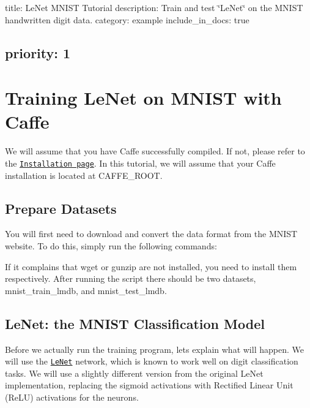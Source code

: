 

 title\+: Le\+Net M\+N\+I\+ST Tutorial description\+: Train and test \char`\"{}\+Le\+Net\char`\"{} on the M\+N\+I\+ST handwritten digit data. category\+: example include\+\_\+in\+\_\+docs\+: true \subsection*{priority\+: 1 }

\section*{Training Le\+Net on M\+N\+I\+ST with Caffe}

We will assume that you have Caffe successfully compiled. If not, please refer to the \href{/installation.html}{\tt Installation page}. In this tutorial, we will assume that your Caffe installation is located at {\ttfamily C\+A\+F\+F\+E\+\_\+\+R\+O\+OT}.

\subsection*{Prepare Datasets}

You will first need to download and convert the data format from the M\+N\+I\+ST website. To do this, simply run the following commands\+: 


If it complains that {\ttfamily wget} or {\ttfamily gunzip} are not installed, you need to install them respectively. After running the script there should be two datasets, {\ttfamily mnist\+\_\+train\+\_\+lmdb}, and {\ttfamily mnist\+\_\+test\+\_\+lmdb}.

\subsection*{Le\+Net\+: the M\+N\+I\+ST Classification Model}

Before we actually run the training program, let\textquotesingle{}s explain what will happen. We will use the \href{http://yann.lecun.com/exdb/publis/pdf/lecun-01a.pdf}{\tt Le\+Net} network, which is known to work well on digit classification tasks. We will use a slightly different version from the original Le\+Net implementation, replacing the sigmoid activations with Rectified Linear Unit (Re\+LU) activations for the neurons.

